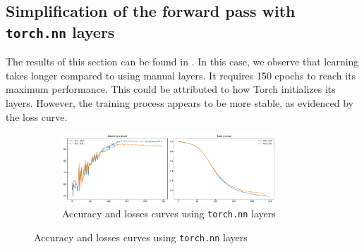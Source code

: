 \subsection{Simplification of the forward pass with \texttt{torch.nn} layers}

The results of this section can be found in . In this case, we observe that learning takes longer compared to using manual layers. It requires 150 epochs to reach its maximum performance. This could be attributed to how Torch initializes its layers. However, the training process appears to be more stable, as evidenced by the loss curve.

\begin{figure}[H]
    \centering
    \begin{subfigure}{\textwidth}
        \centering
        \includegraphics[width=0.88\textwidth]{figs/NN/torchnn_acc_loss.pdf}
        \caption{Accuracy and losses curves using \texttt{torch.nn} layers}
        \label{subfig:torchnn_acc_loss}
    \end{subfigure}
\end{figure}

